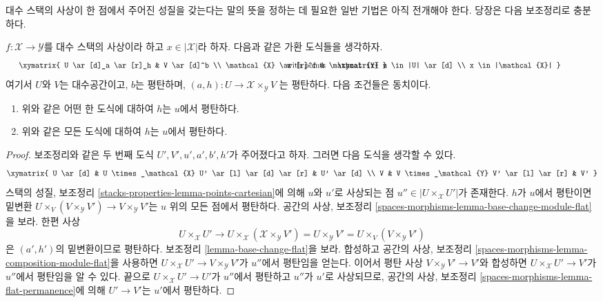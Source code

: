 \noindent
대수 스택의 사상이 한 점에서 주어진 성질을 갖는다는 말의 뜻을 정하는 데
필요한 일반 기법은 아직 전개해야 한다. 당장은 다음 보조정리로 충분하다.

\begin{lemma}
\label{lemma-flat-at-point}
$f : \mathcal{X} \to \mathcal{Y}$를 대수 스택의 사상이라 하고
$x \in |\mathcal{X}|$라 하자. 다음과 같은 가환 도식들을 생각하자.
$$
\vcenter{
\xymatrix{
U \ar[d]_a \ar[r]_h & V \ar[d]^b \\
\mathcal{X} \ar[r]^f & \mathcal{Y}
}
}
\quad\text{with points}
\vcenter{
\xymatrix{
u \in |U| \ar[d] \\
x \in |\mathcal{X}|
}
}
$$
여기서 $U$와 $V$는 대수공간이고, $b$는 평탄하며,
$(a, h) : U \to \mathcal{X} \times_\mathcal{Y} V$
는 평탄하다. 다음 조건들은 동치이다.
\begin{enumerate}
\item 위와 같은 어떤 한 도식에 대하여 $h$는 $u$에서 평탄하다.
\item 위와 같은 모든 도식에 대하여 $h$는 $u$에서 평탄하다.
\end{enumerate}
\end{lemma}

\begin{proof}
보조정리와 같은 두 번째 도식 $U', V', u', a', b', h'$가 주어졌다고
하자. 그러면 다음 도식을 생각할 수 있다.
$$
\xymatrix{
U \ar[d] & U \times_\mathcal{X} U' \ar[l] \ar[d] \ar[r] & U' \ar[d] \\
V & V \times_\mathcal{Y} V' \ar[l] \ar[r] & V'
}
$$
스택의 성질, 보조정리
\ref{stacks-properties-lemma-points-cartesian}에 의해 $u$와 $u'$로
사상되는 점 $u'' \in |U \times_\mathcal{X} U'|$가 존재한다. $h$가
$u$에서 평탄이면 밑변환
$U \times_V (V \times_\mathcal{Y} V') \to V \times_\mathcal{Y} V'$는
$u$ 위의 모든 점에서 평탄하다. 공간의 사상, 보조정리
\ref{spaces-morphisms-lemma-base-change-module-flat}을 보라. 한편 사상
$$
U \times_\mathcal{X} U' \to
U \times_\mathcal{X} (\mathcal{X} \times_\mathcal{Y} V') =
U \times_\mathcal{Y} V' =
U \times_V (V \times_\mathcal{Y} V')
$$
은 $(a', h')$의 밑변환이므로 평탄하다. 보조정리
\ref{lemma-base-change-flat}을 보라. 합성하고 공간의 사상, 보조정리
\ref{spaces-morphisms-lemma-composition-module-flat}을 사용하면
$U \times_\mathcal{X} U' \to V \times_\mathcal{Y} V'$가 $u''$에서
평탄임을 얻는다. 이어서 평탄 사상
$V \times_\mathcal{Y} V' \to V'$와 합성하면
$U \times_\mathcal{X} U' \to V'$가 $u''$에서 평탄임을 알 수 있다.
끝으로 $U \times_\mathcal{X} U' \to U'$가 $u''$에서 평탄하고 $u''$가
$u'$로 사상되므로, 공간의 사상, 보조정리
\ref{spaces-morphisms-lemma-flat-permanence}에 의해 $U' \to V'$는
$u'$에서 평탄하다.
\end{proof}

